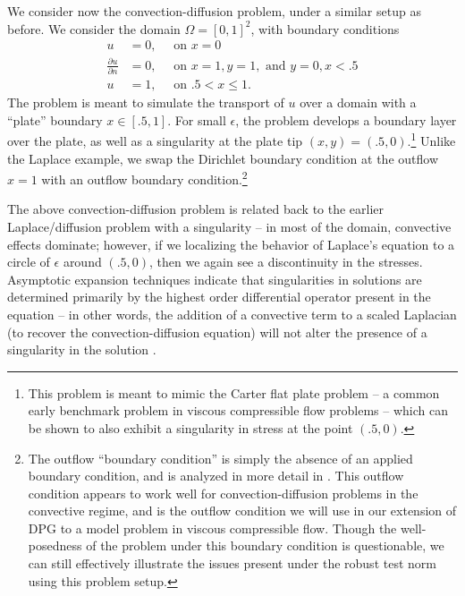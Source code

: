 \documentclass[letterpaper]{article}
\newcommand{\pd}[2]{\frac{\partial#1}{\partial#2}}
\begin{document}
We consider now the convection-diffusion problem, under a similar setup as
before.  We consider the domain $\Omega = [0,1]^2$, with boundary conditions
\begin{align*}
u &= 0,\quad \text{ on } x = 0\\
\pd{u}{n} &= 0,\quad \text{ on } x = 1, y = 1, \text{ and } y = 0, x < .5\\
u &= 1,\quad \text{ on } .5 < x \leq 1.
\end{align*}
The problem is meant to simulate the transport of $u$ over a domain with a
``plate'' boundary $x \in [.5,1]$.  For small $\epsilon$, the problem develops
a boundary layer over the plate, as well as a singularity at the plate tip
$(x,y) = (.5,0)$.\footnote{This problem is meant to mimic the Carter flat
plate problem -- a common early benchmark problem in viscous compressible flow
problems -- which can be shown to also exhibit a singularity in stress at the
point $(.5,0)$.}  Unlike the Laplace example, we swap the Dirichlet boundary
condition at the outflow $x=1$ with an outflow boundary
condition.\footnote{The outflow ``boundary condition'' is simply the absence
of an applied boundary condition, and is analyzed in more detail in
\cite{FLD:FLD505}.  This outflow condition appears to work well for
convection-diffusion problems in the convective regime, and is the outflow
condition we will use in our extension of DPG to a model problem in viscous
compressible flow.  Though the well-posedness of the problem under this
boundary condition is questionable, we can still effectively illustrate the
issues present under the robust test norm using this problem setup.  }

The above convection-diffusion problem is related back to the earlier
Laplace/diffusion problem with a singularity -- in most of the domain,
convective effects dominate; however, if we  localizing the behavior of
Laplace's equation to a circle of $\epsilon$ around $(.5,0)$, then we again
see a discontinuity in the stresses.  Asymptotic expansion techniques indicate
that singularities in solutions are determined primarily by the highest order
differential operator present in the equation -- in other words, the addition
of a convective term to a scaled Laplacian (to recover the
convection-diffusion equation) will not alter the presence of a singularity in
the solution \cite{roos2008robust}.  
\end{document}

